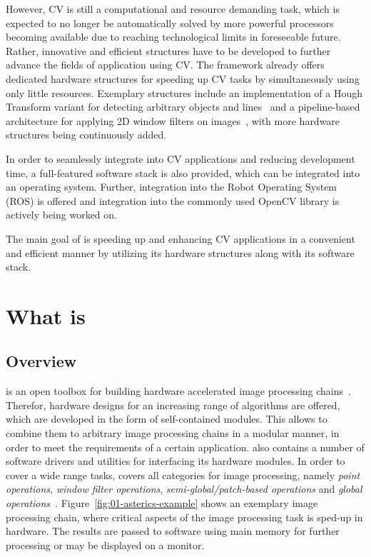 However, CV is still a computational and resource demanding task, which is expected to no longer be automatically solved by more powerful processors becoming available due to reaching technological limits in foreseeable future.
Rather, innovative and efficient structures have to be developed to further advance the fields of application using CV.
The \asterics framework already offers dedicated hardware structures for speeding up CV tasks by simultaneously using only little resources. 
Exemplary structures include an implementation of a Hough Transform variant for detecting arbitrary objects and lines~\cite{kiefer_configurable_2016} and a pipeline-based architecture for applying 2D window filters on images~\cite{pohl_efficient_2014}, with more hardware structures being continuously added.

In order to seamlessly integrate \asterics into CV applications and reducing development time, a full-featured software stack is also provided, which can be integrated into an operating system.
Further, integration into the Robot Operating System (ROS) is offered and integration into the commonly used OpenCV library is actively being worked on.

The main goal of \asterics is speeding up and enhancing CV applications in a convenient and efficient manner by utilizing its hardware structures along with its software stack.



\section{What is \asterics}

\subsection{Overview}
\asterics is an open toolbox for building hardware accelerated image processing chains~\cite{EES_ew_2015_asterics}.
Therefor, hardware designs for an increasing range of algorithms are offered, which are developed in the form of self-contained modules.
This allows to combine them to arbitrary image processing chains in a modular manner, in order to meet the requirements of a certain application.
\asterics also contains a number of software drivers and utilities for interfacing its hardware modules.
In order to cover a wide range tasks, \asterics covers all categories for image processing, namely \textit{point operations}, \textit{window filter operations}, \textit{semi-global/patch-based operations} and \textit{global operations}~\cite{pohl_efficient_2014}.
Figure~\ref{fig:01-asterics-example} shows an exemplary image processing chain, where critical aspects of the image processing task is sped-up in hardware.
The results are passed to software using main memory for further processing or may be displayed on a monitor.

